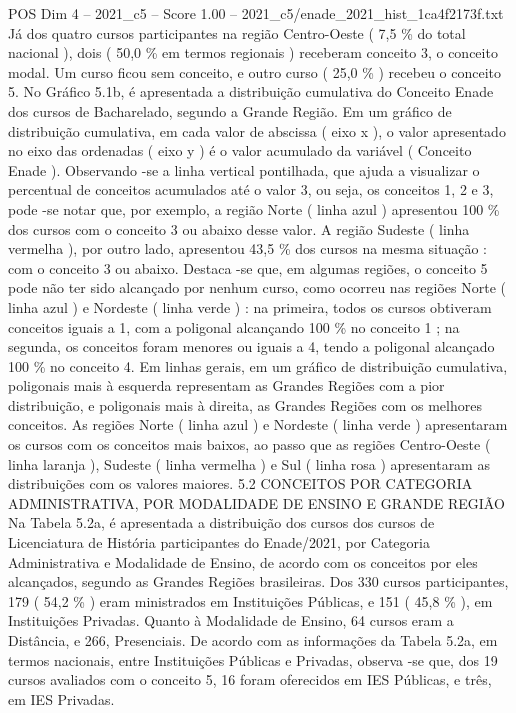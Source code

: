 \begin{textsample}{POS Dim 4 – 2021\_c5 – Score 1.00 – 2021\_c5/enade\_2021\_hist\_1ca4f2173f.txt}
Já dos quatro cursos participantes na região Centro-Oeste ( 7,5 \% do total nacional ), dois ( 50,0 \% em termos regionais ) receberam conceito 3, o conceito modal.
Um curso ficou sem conceito, e outro curso ( 25,0 \% ) recebeu o conceito 5.
No Gráfico 5.1b, é apresentada a distribuição cumulativa do Conceito Enade dos cursos de Bacharelado, segundo a Grande Região.
Em um gráfico de distribuição cumulativa, em cada valor de abscissa ( eixo x ), o valor apresentado no eixo das ordenadas ( eixo y ) é o valor acumulado da variável ( Conceito Enade ).
Observando -se a linha vertical pontilhada, que ajuda a visualizar o percentual de conceitos acumulados até o valor 3, ou seja, os conceitos 1, 2 e 3, pode -se notar que, por exemplo, a região Norte ( linha azul ) apresentou 100 \% dos cursos com o conceito 3 ou abaixo desse valor.
A região Sudeste ( linha vermelha ), por outro lado, apresentou 43,5 \% dos cursos na mesma situação : com o conceito 3 ou abaixo.
Destaca -se que, em algumas regiões, o conceito 5 pode não ter sido alcançado por nenhum curso, como ocorreu nas regiões Norte ( linha azul ) e Nordeste ( linha verde ) : na primeira, todos os cursos obtiveram conceitos iguais a 1, com a poligonal alcançando 100 \% no conceito 1 ; na segunda, os conceitos foram menores ou iguais a 4, tendo a poligonal alcançado 100 \% no conceito 4.
Em linhas gerais, em um gráfico de distribuição cumulativa, poligonais mais à esquerda representam as Grandes Regiões com a pior distribuição, e poligonais mais à direita, as Grandes Regiões com os melhores conceitos.
As regiões Norte ( linha azul ) e Nordeste ( linha verde ) apresentaram os cursos com os conceitos mais baixos, ao passo que as regiões Centro-Oeste ( linha laranja ), Sudeste ( linha vermelha ) e Sul ( linha rosa ) apresentaram as distribuições com os valores maiores. 5.2 CONCEITOS POR CATEGORIA ADMINISTRATIVA, POR MODALIDADE DE ENSINO E GRANDE REGIÃO Na Tabela 5.2a, é apresentada a distribuição dos cursos dos cursos de Licenciatura de História participantes do Enade/2021, por Categoria Administrativa e Modalidade de Ensino, de acordo com os conceitos por eles alcançados, segundo as Grandes Regiões brasileiras.
Dos 330 cursos participantes, 179 ( 54,2 \% ) eram ministrados em Instituições Públicas, e 151 ( 45,8 \% ), em Instituições Privadas.
Quanto à Modalidade de Ensino, 64 cursos eram a Distância, e 266, Presenciais.
De acordo com as informações da Tabela 5.2a, em termos nacionais, entre Instituições Públicas e Privadas, observa -se que, dos 19 cursos avaliados com o conceito 5, 16 foram oferecidos em IES Públicas, e três, em IES Privadas.

\end{textsample}

